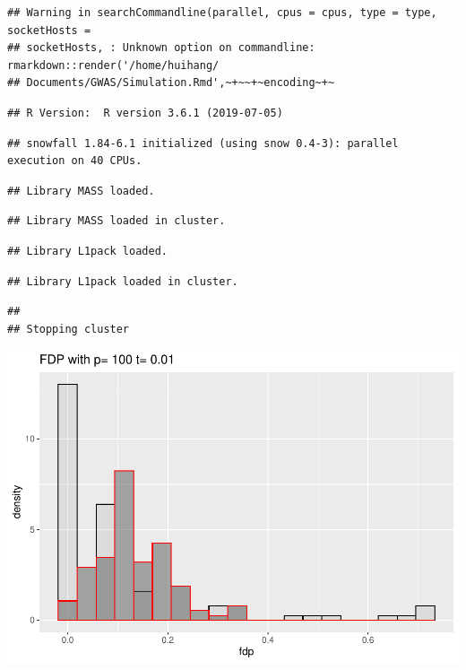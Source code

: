 \documentclass[]{article}
\begin{document}
\begin{verbatim}
## Warning in searchCommandline(parallel, cpus = cpus, type = type, socketHosts =
## socketHosts, : Unknown option on commandline: rmarkdown::render('/home/huihang/
## Documents/GWAS/Simulation.Rmd',~+~~+~encoding~+~
\end{verbatim}

\begin{verbatim}
## R Version:  R version 3.6.1 (2019-07-05)
\end{verbatim}

\begin{verbatim}
## snowfall 1.84-6.1 initialized (using snow 0.4-3): parallel execution on 40 CPUs.
\end{verbatim}

\begin{verbatim}
## Library MASS loaded.
\end{verbatim}

\begin{verbatim}
## Library MASS loaded in cluster.
\end{verbatim}

\begin{verbatim}
## Library L1pack loaded.
\end{verbatim}

\begin{verbatim}
## Library L1pack loaded in cluster.
\end{verbatim}

\begin{verbatim}
## 
## Stopping cluster
\end{verbatim}

\includegraphics{Simulation_files/figure-latex/unnamed-chunk-1-1.pdf}
\end{document}
